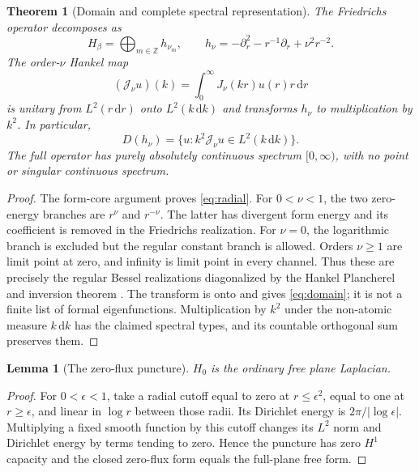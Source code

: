 \documentclass[10pt]{article}
\newcommand{\dd}{\,\mathrm d}
\newcommand{\JJ}{\mathcal J}
\newtheorem{theorem}{Theorem}
\newtheorem{lemma}{Lemma}
\begin{document}
\begin{theorem}[Domain and complete spectral representation]
The Friedrichs operator decomposes as
\begin{equation}
H_\beta=\bigoplus_{m\in\mathbb Z}h_{\nu_m},\qquad
h_\nu=-\partial_r^2-r^{-1}\partial_r+\nu^2r^{-2}.
\label{eq:radial}
\end{equation}
The order-$\nu$ Hankel map
\begin{equation}
(\JJ_\nu u)(k)=\int_0^\infty J_\nu(kr)u(r)r\dd r
\label{eq:hankel}
\end{equation}
is unitary from $L^2(r\dd r)$ onto $L^2(k\dd k)$ and transforms $h_\nu$
to multiplication by $k^2$. In particular,
\begin{equation}
D(h_\nu)=\{u:k^2\JJ_\nu u\in L^2(k\dd k)\}.
\label{eq:domain}
\end{equation}
The full operator has purely absolutely continuous spectrum $[0,\infty)$,
with no point or singular continuous spectrum.
\end{theorem}
\begin{proof}
The form-core argument proves \eqref{eq:radial}. For $0<\nu<1$, the two
zero-energy branches are $r^\nu$ and $r^{-\nu}$. The latter has divergent
form energy and its coefficient is removed in the Friedrichs realization.
For $\nu=0$, the logarithmic branch is excluded but the regular constant
branch is allowed. Orders $\nu\ge1$ are limit point at zero, and infinity
is limit point in every channel. Thus these are precisely the regular Bessel
realizations diagonalized by the Hankel Plancherel and inversion theorem
\cite{DLMF}. The transform is onto and gives \eqref{eq:domain}; it is not a
finite list of formal eigenfunctions. Multiplication by $k^2$ under the
non-atomic measure $k\dd k$ has the claimed spectral types, and its countable
orthogonal sum preserves them.
\end{proof}

\begin{lemma}[The zero-flux puncture]
$H_0$ is the ordinary free plane Laplacian.
\end{lemma}
\begin{proof}
For $0<\epsilon<1$, take a radial cutoff equal to zero at $r\le\epsilon^2$,
equal to one at $r\ge\epsilon$, and linear in $\log r$ between those radii.
Its Dirichlet energy is $2\pi/|\log\epsilon|$. Multiplying a fixed smooth
function by this cutoff changes its $L^2$ norm and Dirichlet energy by terms
tending to zero. Hence the puncture has zero $H^1$ capacity and the closed
zero-flux form equals the full-plane free form.
\end{proof}
\end{document}

